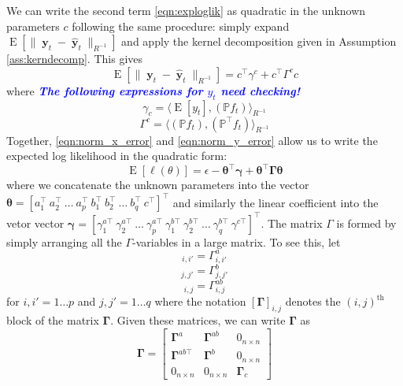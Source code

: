 \documentclass{IEEEtran}
\newcommand{\todo}[1]{\textsf{\emph{\textbf{\textcolor{blue}{#1}}}}}
\newcommand{\inner}[3]{\langle#1,#2\rangle_{#3}}
\newcommand{\dist}[2]{\|#1\|_{#2}}
\DeclareMathOperator{\E}{E}
\DeclareMathOperator{\yvec}{\mathbf{y}}
\begin{document}
We can write the second term \ref{eqn:exploglik} as quadratic in the unknown parameters $c$ following the same procedure: simply expand $\E[\dist{\yvec_t-\hat{\yvec}_t}{R^{-1}}]$ and apply the kernel decomposition given in Assumption \ref{ass:kerndecomp}. This gives
\begin{equation}
	\label{eqn:norm_y_error}
	\E[\dist{\yvec_t-\hat{\yvec}_t}{R^{-1}}] = c^\top \gamma^c + c^\top \Gamma^c c
\end{equation}
where \todo{The following expressions for $y_t$ need checking!}
\begin{equation}
	\gamma_c = \inner
	{\E[y_t]}
	{(\mathbb{P} f_t)}
	{R^{-1}}
\end{equation}
\begin{equation}
	 \Gamma^c = \inner
		{(\mathbb{P} f_t)}
		{(\mathbb{P}^\top f_t)}
		{R^{-1}}
\end{equation}
Together, \ref{eqn:norm_x_error} and \ref{eqn:norm_y_error} allow us to write the expected log likelihood in the quadratic form:
\begin{equation}
	\E[\ell(\theta)] = \epsilon - \boldsymbol{\theta}^\top \boldsymbol{\gamma} + \boldsymbol{\theta}^\top \boldsymbol{\Gamma} \boldsymbol{\theta}
\end{equation}
where we concatenate the unknown parameters into the vector $\boldsymbol{\theta} = [a_1^\top ~ a_2^\top ~ \ldots ~ a_p^\top ~ b_1^\top ~ b_2^\top ~ \ldots ~ b_q^\top ~ c^\top]^\top$ and similarly the linear coefficient into the vetor vector $\boldsymbol{\gamma} = [\gamma^{a\top}_1 ~ \gamma^{a\top}_2 ~ \ldots ~ \gamma^{a\top}_p ~ \gamma^{b\top}_1 ~ \gamma^{b\top}_2 ~ \ldots ~ \gamma^{b\top}_q ~ \gamma^{c\top}]^\top$. The matrix $\Gamma$ is formed by simply arranging all the $\Gamma$-variables in a large matrix. To see this, let 
\begin{equation}
	[\boldsymbol{\Gamma}^a]_{i,i'} = \Gamma_{i,i'}^a 
\end{equation}
\begin{equation}
	[\boldsymbol{\Gamma}^b]_{j,j'} = \Gamma_{j,j'}^b 
\end{equation}
\begin{equation}
	[\boldsymbol{\Gamma}^{ab}]_{i,j} = \Gamma_{i,j}^{ab}
\end{equation}
for $i,i' = 1 \ldots p$ and $j,j' = 1 \ldots q$ where the notation $[\boldsymbol{\Gamma}]_{i,j}$ denotes the $(i,j)^\mathrm{th}$ block of the matrix $\boldsymbol{\Gamma}$. Given these matrices, we can write $\boldsymbol{\Gamma}$ as 
\begin{equation}
	\boldsymbol{\Gamma} = \begin{bmatrix}
		\boldsymbol{\Gamma}^a & \boldsymbol{\Gamma}^{ab} & 0_{n\times n} \\
		\boldsymbol{\Gamma}^{ab\top} & \boldsymbol{\Gamma}^{b} & 0_{n\times n} \\
		0_{n\times n} & 0_{n\times n} & \boldsymbol{\Gamma}_c
	\end{bmatrix}
\end{equation}
\end{document}

